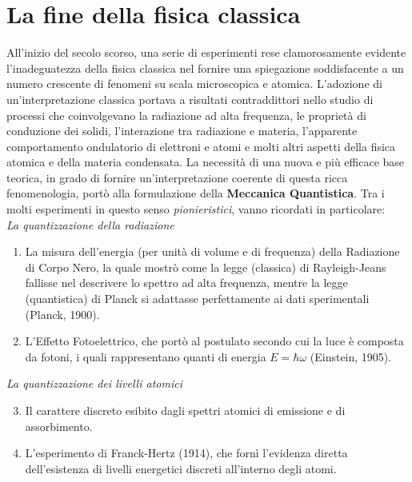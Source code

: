 
\chapter{La fine della fisica classica}
All'inizio del secolo scorso, una serie di esperimenti rese clamorosamente evidente l'inadeguatezza della fisica classica nel fornire una spiegazione soddisfacente a un numero crescente di fenomeni su scala microscopica e atomica. L'adozione di un'interpretazione classica portava a risultati contraddittori nello studio di processi che coinvolgevano la radiazione ad alta frequenza, le proprietà di conduzione dei solidi, l'interazione tra radiazione e materia, l'apparente comportamento ondulatorio di elettroni e atomi e molti altri aspetti della fisica atomica e della materia condensata. La necessità di una nuova e più efficace base teorica, in grado di fornire un'interpretazione coerente di questa ricca fenomenologia, portò alla formulazione della \textbf{Meccanica Quantistica}. Tra i molti esperimenti in questo senso \emph{pionieristici}, vanno ricordati in particolare: \\

\noindent
\emph{La quantizzazione della radiazione}
\begin{enumerate}
    \item La misura dell'energia (per unità di volume e di frequenza) della Radiazione di Corpo Nero, la quale mostrò come la legge (classica) di Rayleigh-Jeans fallisse nel descrivere lo spettro ad alta frequenza, mentre la legge (quantistica) di Planck si adattasse perfettamente ai dati sperimentali (Planck, 1900).
    \item L'Effetto Fotoelettrico, che portò al postulato secondo cui la luce è composta da fotoni, i quali rappresentano quanti di energia $E = \hbar\omega$ (Einstein, 1905).
\end{enumerate}

\noindent \emph{La quantizzazione dei livelli atomici}
\begin{enumerate}
    \setcounter{enumi}{2}
    \item Il carattere discreto esibito dagli spettri atomici di emissione e di assorbimento.
    \item L'esperimento di Franck-Hertz (1914), che fornì l'evidenza diretta dell'esistenza di livelli energetici discreti all'interno degli atomi.
\end{enumerate}

